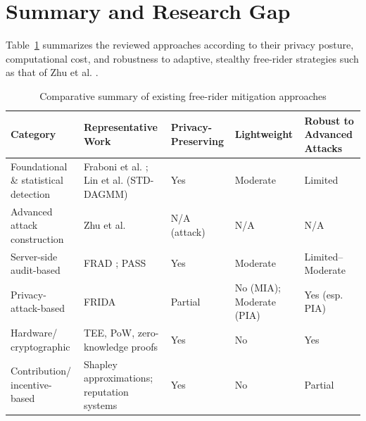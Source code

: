 \section{Summary and Research Gap}
\label{subsec:research-gap}

Table~\ref{tab:related-work-summary} summarizes the reviewed approaches according to their privacy posture, computational cost, and robustness to adaptive, stealthy free-rider strategies such as that of Zhu et al. \cite{zhu2023advanced}.

\begin{table}[htbp]
\centering
\caption{Comparative summary of existing free-rider mitigation approaches}
\label{tab:related-work-summary}
\begin{tabular}{p{3cm}p{3.6cm}p{2.1cm}p{2.1cm}p{2.4cm}}
\toprule
\textbf{Category} & \textbf{Representative Work} & \textbf{Privacy-Preserving} & \textbf{Lightweight} & \textbf{Robust to Advanced Attacks} \\
\midrule
Foundational \& statistical detection & Fraboni et al. \cite{fraboni2021freerider}; Lin et al. \cite{lin2019freeriders} (STD-DAGMM) & Yes & Moderate & Limited \\
Advanced attack construction & Zhu et al. \cite{zhu2023advanced} & N/A (attack) & N/A & N/A \\
Server-side audit-based & FRAD \cite{wang2024frad}; PASS \cite{wang2023pass} & Yes & Moderate & Limited--Moderate \\
Privacy-attack-based & FRIDA \cite{recasens2024frida} & Partial\footnotemark & No (MIA); Moderate (PIA) & Yes (esp. PIA) \\
Hardware/ cryptographic & TEE, PoW, zero-knowledge proofs & Yes & No & Yes \\
Contribution/ incentive-based & Shapley approximations; reputation systems & Yes & No & Partial \\
\bottomrule
\end{tabular}
\end{table}

